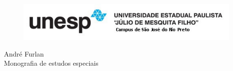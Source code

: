 \thispagestyle{empty}
\begin{center}
	\par \null
	\begin{figure}[H]
		\centering \includegraphics[angle=-90]{unesp.pdf}
	\end{figure} 
	\vspace{3cm}
	\fontsize{14}{\baselineskip} \selectfont
	{André Furlan} \\  
	\vspace{4.5cm}
	\onehalfspacing
	\fontsize{14}{\baselineskip} \selectfont
	Monografia de estudos especiais \\
\end{center}
